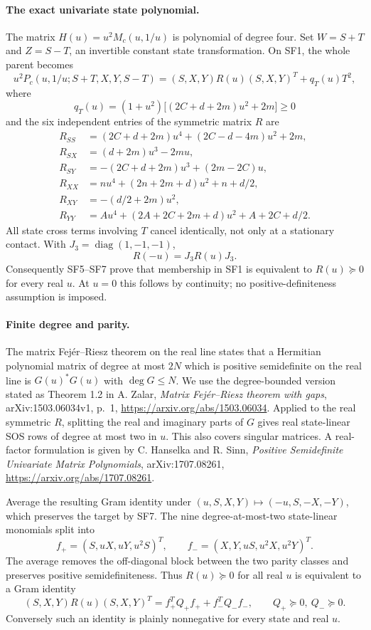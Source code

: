 \paragraph{The exact univariate state polynomial.}
The matrix $H(u)=u^2M_c(u,1/u)$ is polynomial of degree four.
Set $W=S+T$ and $Z=S-T$, an invertible constant state transformation.
On SF1, the whole parent becomes
\[
u^2P_c(u,1/u;S+T,X,Y,S-T)
 =(S,X,Y)R(u)(S,X,Y)^T+q_T(u)T^2,
\tag{SF6}
\]
where
\[
q_T(u)=(1+u^2)\bigl[(2C+d+2m)u^2+2m\bigr]\geq0
\]
and the six independent entries of the symmetric matrix $R$ are
\begin{align*}
R_{SS}&=(2C+d+2m)u^4+(2C-d-4m)u^2+2m,\\
R_{SX}&=(d+2m)u^3-2mu,\\
R_{SY}&=-(2C+d+2m)u^3+(2m-2C)u,\\
R_{XX}&=nu^4+(2n+2m+d)u^2+n+d/2,\\
R_{XY}&=-(d/2+2m)u^2,\\
R_{YY}&=Au^4+(2A+2C+2m+d)u^2+A+2C+d/2.
\end{align*}
All state cross terms involving $T$ cancel identically, not only at a
stationary contact.  With $J_3=\operatorname{diag}(1,-1,-1)$,
\[
R(-u)=J_3R(u)J_3.
\tag{SF7}
\]
Consequently SF5--SF7 prove that membership in SF1 is equivalent to
$R(u)\succeq0$ for every real $u$.  At $u=0$ this follows by
continuity; no positive-definiteness assumption is imposed.

\paragraph{Finite degree and parity.}
The matrix Fej\'er--Riesz theorem on the real line states that a
Hermitian polynomial matrix of degree at most $2N$ which is positive
semidefinite on the real line is $G(u)^*G(u)$ with $\deg G\leq N$.
We use the degree-bounded version stated as Theorem 1.2 in
A. Zalar, \emph{Matrix Fej\'er--Riesz theorem with gaps},
arXiv:1503.06034v1, p.~1,
\url{https://arxiv.org/abs/1503.06034}.
Applied to the real symmetric $R$, splitting the real and imaginary
parts of $G$ gives real state-linear SOS rows of degree at most two
in $u$.  This also covers singular matrices.  A real-factor formulation
is given by C. Hanselka and R. Sinn, \emph{Positive Semidefinite
Univariate Matrix Polynomials}, arXiv:1707.08261,
\url{https://arxiv.org/abs/1707.08261}.

Average the resulting Gram identity under
$(u,S,X,Y)\mapsto(-u,S,-X,-Y)$, which preserves the target by SF7.
The nine degree-at-most-two state-linear monomials split into
\[
f_+=(S,uX,uY,u^2S)^T,\qquad
f_-=(X,Y,uS,u^2X,u^2Y)^T.
\tag{SF8}
\]
The average removes the off-diagonal block between the two parity
classes and preserves positive semidefiniteness.  Thus
$R(u)\succeq0$ for all real $u$ is equivalent to a Gram identity
\[
(S,X,Y)R(u)(S,X,Y)^T=f_+^TQ_+f_++f_-^TQ_-f_-,
\qquad Q_+\succeq0,\ Q_-\succeq0.
\]
Conversely such an identity is
plainly nonnegative for every state and real $u$.

